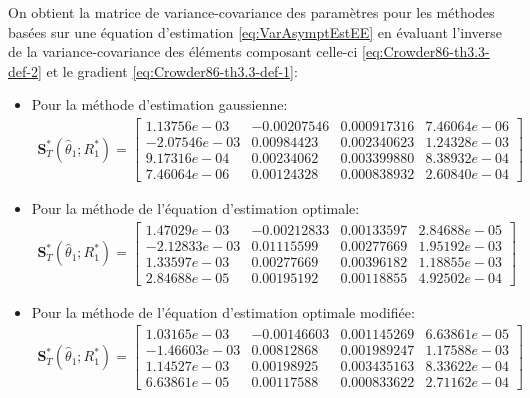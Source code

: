 On obtient la matrice de variance-covariance des paramètres pour les
méthodes basées sur une équation d'estimation
\eqref{eq:VarAsymptEstEE} en évaluant l'inverse de la
variance-covariance des éléments composant celle-ci
\eqref{eq:Crowder86-th3.3-def-2} et le gradient
\eqref{eq:Crowder86-th3.3-def-1}:
\begin{itemize}
\item Pour la méthode d'estimation gaussienne:
  \begin{align}
    \label{eq:vcov1gaussR1}
    \mathbf{S}_T^{*}(\hat\theta_1;R_1^{*}) = \begin{bmatrix}
      1.13756e-03 &-0.00207546& 0.000917316& 7.46064e-06\\
      -2.07546e-03 & 0.00984423& 0.002340623& 1.24328e-03\\
      9.17316e-04 & 0.00234062& 0.003399880& 8.38932e-04\\
      7.46064e-06 & 0.00124328& 0.000838932& 2.60840e-04
    \end{bmatrix}
  \end{align}
\item Pour la méthode de l'équation d'estimation optimale:
  \begin{align}
    \label{eq:vcov1eeR1}
    \mathbf{S}_T^{*}(\hat\theta_1;R_1^{*}) = \begin{bmatrix}
      1.47029e-03 &-0.00212833& 0.00133597& 2.84688e-05\\
      -2.12833e-03 & 0.01115599& 0.00277669& 1.95192e-03\\
      1.33597e-03 & 0.00277669& 0.00396182& 1.18855e-03\\
      2.84688e-05 & 0.00195192& 0.00118855& 4.92502e-04
    \end{bmatrix}
  \end{align}
\item Pour la méthode de l'équation d'estimation optimale modifiée:
  \begin{align}
    \label{eq:vcov1eemodR1}
    \mathbf{S}_T^{*}(\hat\theta_1;R_1^{*}) = \begin{bmatrix}
      1.03165e-03& -0.00146603& 0.001145269& 6.63861e-05\\
      -1.46603e-03&  0.00812868& 0.001989247& 1.17588e-03\\
      1.14527e-03&  0.00198925& 0.003435163& 8.33622e-04\\
      6.63861e-05& 0.00117588& 0.000833622& 2.71162e-04
    \end{bmatrix}
  \end{align}
\end{itemize}


